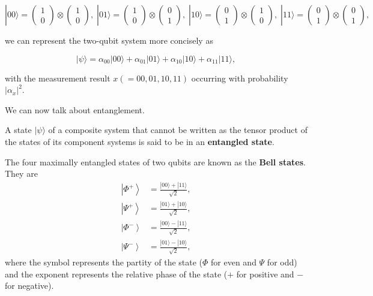 \documentclass{article}
\newcommand{\ket}[1]{\ensuremath{\left|#1\right\rangle}}
\begin{document}
\begin{example}
      \[
        |00\rangle = \begin{pmatrix} 1 \\ 0 \end{pmatrix} \otimes \begin{pmatrix} 1 \\ 0 \end{pmatrix}, \; 
        |01\rangle = \begin{pmatrix} 1 \\ 0 \end{pmatrix} \otimes \begin{pmatrix} 0 \\ 1 \end{pmatrix}, \; 
        |10\rangle = \begin{pmatrix} 0 \\ 1 \end{pmatrix} \otimes \begin{pmatrix} 1 \\ 0 \end{pmatrix}, \; 
        |11\rangle = \begin{pmatrix} 0 \\ 1 \end{pmatrix} \otimes \begin{pmatrix} 0 \\ 1 \end{pmatrix}, 
      \]

      we can represent the two-qubit system more concisely as

        \[|\psi \rangle = \alpha_{00} |00\rangle + \alpha_{01} |01\rangle + \alpha_{10} |10\rangle + \alpha_{11} |11\rangle,\]

      with the measurement result $x ( = 00, 01, 10, 11)$ occurring with probability $|\alpha_{x}|^2$.
    \end{example}

    We can now talk about entanglement. 

    \begin{definition}
      A state $|\psi\rangle$ of a composite system that cannot be written as the tensor product of the states of its component systems is said to be in an \textbf{entangled state}.   
    \end{definition}

    \begin{definition}
      The four maximally entangled states of two qubits are known as the \textbf{Bell states}. They are
      \begin{align}
        \ket{\Phi^+} & = \frac{|00\rangle + |11\rangle}{\sqrt{2}}, \\
        \ket{\Psi^+} & = \frac{|01\rangle + |10\rangle}{\sqrt{2}}, \\
        \ket{\Phi^-} & = \frac{|00\rangle - |11\rangle}{\sqrt{2}}, \\
        \ket{\Psi^-} & = \frac{|01\rangle - |10\rangle}{\sqrt{2}},
      \end{align}
      where the symbol represents the partity of the state ($\Phi$ for even and $\Psi$ for odd) and the exponent represents the relative phase of the state ($+$ for positive and $-$ for negative). 
    \end{definition}
\end{document}
